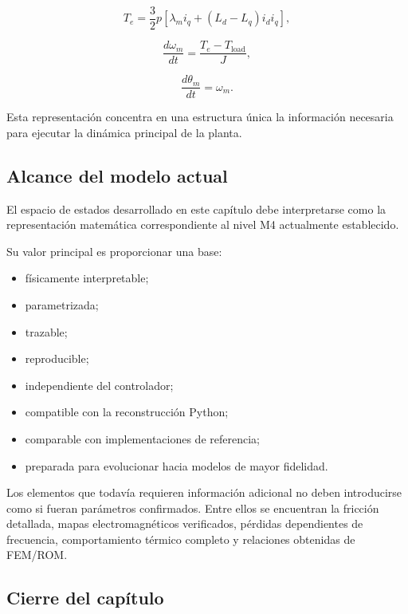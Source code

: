 \begin{equation}
T_e
=
\frac{3}{2}p
\left[
\lambda_mi_q+
(L_d-L_q)i_di_q
\right],
\end{equation}

\begin{equation}
\frac{d\omega_m}{dt}
=
\frac{T_e-T_{\mathrm{load}}}{J},
\end{equation}

\begin{equation}
\frac{d\theta_m}{dt}
=
\omega_m.
\end{equation}

Esta representación concentra en una estructura única la información necesaria para ejecutar la dinámica principal de la planta.

\subsection{Alcance del modelo actual}

El espacio de estados desarrollado en este capítulo debe interpretarse como la representación matemática correspondiente al nivel M4 actualmente establecido.

Su valor principal es proporcionar una base:

\begin{itemize}
    \item físicamente interpretable;
    \item parametrizada;
    \item trazable;
    \item reproducible;
    \item independiente del controlador;
    \item compatible con la reconstrucción Python;
    \item comparable con implementaciones de referencia;
    \item preparada para evolucionar hacia modelos de mayor fidelidad.
\end{itemize}

Los elementos que todavía requieren información adicional no deben introducirse como si fueran parámetros confirmados. Entre ellos se encuentran la fricción detallada, mapas electromagnéticos verificados, pérdidas dependientes de frecuencia, comportamiento térmico completo y relaciones obtenidas de FEM/ROM.

\subsection{Cierre del capítulo}

